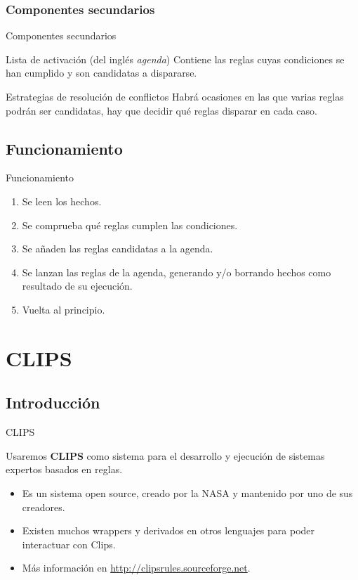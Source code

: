 \documentclass[smaller,spanish,xcolor=svgnames]{beamer}
\begin{document}
\subsubsection{Componentes secundarios}

\begin{frame}{Componentes secundarios}
    \begin{block}{Lista de activación (del inglés \textit{agenda})}
      Contiene las reglas cuyas condiciones se han cumplido y son candidatas a
      dispararse.
    \end{block}

    \begin{block}{Estrategias de resolución de conflictos}
      Habrá ocasiones en las que varias reglas podrán ser candidatas, hay que
      decidir qué reglas disparar en cada caso.
    \end{block}  
\end{frame}

\subsection{Funcionamiento}
\begin{frame}{Funcionamiento}
  \begin{enumerate}
  \item Se leen los hechos.
  \item Se comprueba qué reglas cumplen las condiciones.
  \item Se añaden las reglas candidatas a la agenda.
  \item Se lanzan las reglas de la agenda, generando y/o borrando hechos como resultado de su ejecución.
  \item Vuelta al principio.
  \end{enumerate}

\end{frame}

\section{CLIPS}

\subsection{Introducción}

\begin{frame}{CLIPS}
  \begin{block}{}
    Usaremos \textbf{CLIPS} como sistema para el desarrollo y ejecución de
    sistemas expertos basados en reglas.
  \end{block}

  \begin{itemize}
  \item Es un sistema open source, creado por la NASA y mantenido por uno de sus
    creadores.
  \item Existen muchos wrappers y derivados en otros lenguajes para poder
    interactuar con Clips.
  \item Más información en \url{http://clipsrules.sourceforge.net}.
  \end{itemize}
\end{frame}
\end{document}
